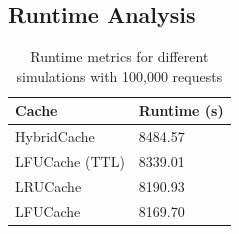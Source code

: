 \subsection{Runtime Analysis}

\begin{table}[ht]
    \centering
    \caption{Runtime metrics for different simulations with 100,000 requests}
    \label{tab:test_simulation_metrics}
    \begin{tabularx}{\linewidth}{XX}
        \toprule
        \textbf{Cache} & \textbf{Runtime (s)} \\
        \midrule
        HybridCache & 8484.57\\
        LFUCache (TTL) & 8339.01\\
        LRUCache & 8190.93\\
        LFUCache & 8169.70\\
        \bottomrule
    \end{tabularx}
\end{table}